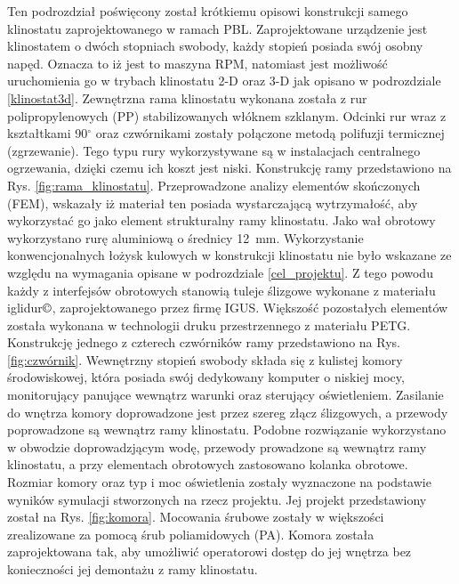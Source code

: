 Ten podrozdział poświęcony został krótkiemu opisowi konstrukcji samego klinostatu
zaprojektowanego w ramach PBL. Zaprojektowane urządzenie jest klinostatem o dwóch stopniach
swobody, każdy stopień posiada swój osobny napęd. Oznacza to iż jest to maszyna RPM, natomiast
jest możliwość uruchomienia go w trybach klinostatu 2-D oraz 3-D jak opisano w podrozdziale
\ref{klinostat3d}. Zewnętrzna rama klinostatu wykonana została z rur polipropylenowych (PP)
stabilizowanych włóknem szklanym. Odcinki rur wraz z kształtkami 90$^\circ$ oraz
czwórnikami zostały połączone metodą polifuzji termicznej (zgrzewanie). Tego typu rury
wykorzystywane są w instalacjach centralnego ogrzewania, dzięki czemu ich koszt jest
niski. Konstrukcję ramy przedstawiono na Rys. \ref{fig:rama_klinostatu}. Przeprowadzone
analizy elementów skończonych (FEM), wskazały iż materiał ten posiada wystarczającą
wytrzymałość, aby wykorzystać go jako element strukturalny ramy klinostatu. Jako wał
obrotowy wykorzystano rurę aluminiową o średnicy \SI{12}{mm}. Wykorzystanie
konwencjonalnych łożysk kulowych w konstrukcji klinostatu nie było wskazane ze
względu na wymagania opisane w podrozdziale \ref{cel_projektu}. Z tego powodu każdy
z interfejsów obrotowych stanowią tuleje ślizgowe wykonane z materiału
iglidur$\copyright$, zaprojektowanego przez firmę IGUS. Większość pozostałych
elementów została wykonana \linebreak w technologii druku przestrzennego z materiału PETG.
Konstrukcję jednego \linebreak z czterech czwórników ramy przedstawiono na Rys.
\ref{fig:czwórnik}. Wewnętrzny stopień swobody składa się z kulistej komory
środowiskowej, która posiada swój dedykowany komputer o niskiej mocy,
monitorujący panujące wewnątrz warunki oraz sterujący oświetleniem.
Zasilanie do wnętrza komory doprowadzone jest przez szereg złącz
ślizgowych, a przewody poprowadzone są wewnątrz ramy klinostatu. Podobne
rozwiązanie wykorzystano w obwodzie doprowadzjącym wodę, przewody
prowadzone są wewnątrz ramy klinostatu, a przy elementach obrotowych
zastosowano kolanka obrotowe. Rozmiar komory oraz typ i moc oświetlenia
zostały wyznaczone na podstawie wyników symulacji stworzonych na rzecz
projektu. Jej projekt przedstawiony został na Rys. \ref{fig:komora}.
Mocowania śrubowe zostały w większości zrealizowane za pomocą śrub
poliamidowych (PA). Komora została zaprojektowana tak, aby umożliwić operatorowi dostęp do jej
wnętrza bez konieczności jej demontażu \linebreak z ramy klinostatu.

